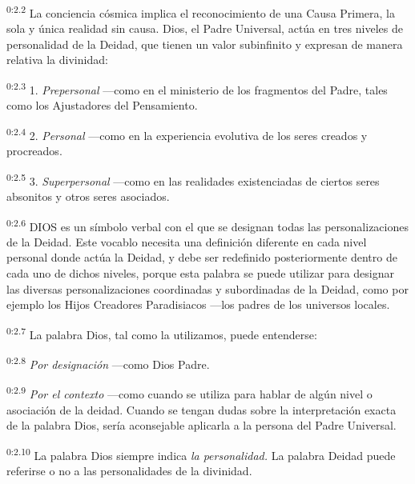 \par
\textsuperscript{0:2.2} La conciencia cósmica implica el reconocimiento de una Causa Primera, la sola y única realidad sin causa. Dios, el Padre Universal, actúa en tres niveles de personalidad de la Deidad, que tienen un valor subinfinito y expresan de manera relativa la divinidad:

\par
\textsuperscript{0:2.3} 1. \textit{Prepersonal} ---como en el ministerio de los fragmentos del Padre, tales como los Ajustadores del Pensamiento.

\par
\textsuperscript{0:2.4} 2. \textit{Personal} ---como en la experiencia evolutiva de los seres creados y procreados.

\par
\textsuperscript{0:2.5} 3. \textit{Superpersonal} ---como en las realidades existenciadas de ciertos seres absonitos y otros seres asociados.

\par
\textsuperscript{0:2.6} DIOS es un símbolo verbal con el que se designan todas las personalizaciones de la Deidad. Este vocablo necesita una definición diferente en cada nivel personal donde actúa la Deidad, y debe ser redefinido posteriormente dentro de cada uno de dichos niveles, porque esta palabra se puede utilizar para designar las diversas personalizaciones coordinadas y subordinadas de la Deidad, como por ejemplo los Hijos Creadores Paradisiacos ---los padres de los universos locales.

\par
\textsuperscript{0:2.7} La palabra Dios, tal como la utilizamos, puede entenderse:

\par
\textsuperscript{0:2.8} \textit{Por designación} ---como Dios Padre.

\par
\textsuperscript{0:2.9} \textit{Por el contexto} ---como cuando se utiliza para hablar de algún nivel o asociación de la deidad. Cuando se tengan dudas sobre la interpretación exacta de la palabra Dios, sería aconsejable aplicarla a la persona del Padre Universal.

\par
\textsuperscript{0:2.10} La palabra Dios siempre indica \textit{la personalidad.} La palabra Deidad puede referirse o no a las personalidades de la divinidad.


